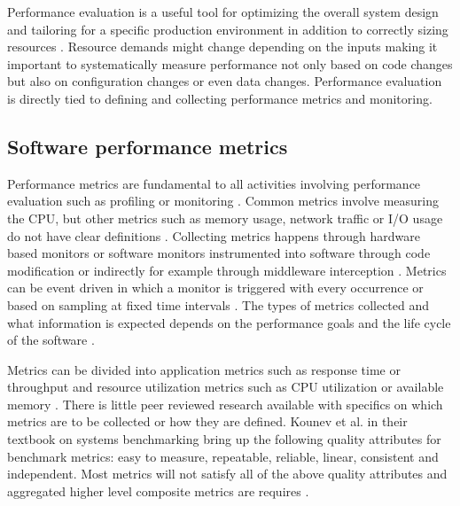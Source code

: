 Performance evaluation is a useful tool for optimizing the overall system design and tailoring for a specific production environment in addition to correctly sizing resources \parencite{brunnertPerformanceorientedDevOpsResearch2015,wallerIncludingPerformanceBenchmarks2015}. Resource demands might change depending on the inputs \parencite{brunnertPerformanceorientedDevOpsResearch2015} making it important to systematically measure performance not only based on code changes but also on configuration changes or even data changes. Performance evaluation is directly tied to defining and collecting performance metrics and monitoring.

\subsection{Software performance metrics}

Performance metrics are fundamental to all activities involving performance evaluation such as profiling or monitoring \parencite{brunnertPerformanceorientedDevOpsResearch2015}. Common metrics involve measuring the CPU, but other metrics such as memory usage, network traffic or I/O usage do not have clear definitions \parencite{brunnertPerformanceorientedDevOpsResearch2015}. Collecting metrics happens through hardware based monitors or software monitors instrumented into software through code modification or indirectly for example through middleware interception \parencite{brunnertPerformanceorientedDevOpsResearch2015}. Metrics can be event driven in which a monitor is triggered with every occurrence or based on sampling at fixed time intervals \parencite{brunnertPerformanceorientedDevOpsResearch2015}. The types of metrics collected and what information is expected depends on the performance goals and the life cycle of the software \parencite{brunnertPerformanceorientedDevOpsResearch2015}.

Metrics can be divided into application metrics such as response time or throughput and resource utilization metrics such as CPU utilization or available memory \parencite{brunnertPerformanceorientedDevOpsResearch2015}. There is little peer reviewed research available with specifics on which metrics are to be collected or how they are defined. Kounev et al. \parencite*{kounevSystemsBenchmarkingScientists2020} in their textbook on systems benchmarking bring up the following quality attributes for benchmark metrics: easy to measure, repeatable, reliable, linear, consistent and independent. Most metrics will not satisfy all of the above quality attributes and aggregated higher level composite metrics are requires \parencite{kounevSystemsBenchmarkingScientists2020}.

